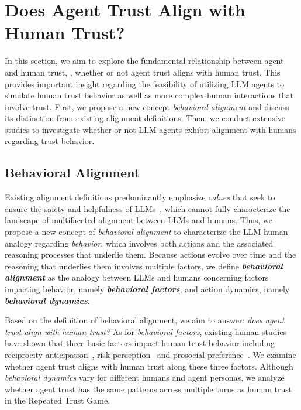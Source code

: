 

\vspace{-0.25cm}
\section{Does Agent Trust Align with Human Trust?}
\label{sec:alignment}
\vspace{-1.5mm}








In this section, we aim to explore the fundamental relationship between agent and human trust, \ie, whether or not agent trust aligns with human trust. This provides important insight regarding the feasibility of utilizing LLM agents to simulate human trust behavior as well as more complex human interactions that involve trust. First, we propose a new concept \textit{behavioral alignment} and discuss its distinction from existing alignment definitions. Then, we conduct extensive studies to investigate whether or not LLM agents exhibit alignment with humans regarding trust behavior. 

\vspace{-2mm}
\subsection{Behavioral Alignment}
\vspace{-1mm}
Existing alignment definitions predominantly emphasize \textit{values} that seek to ensure the safety and helpfulness of LLMs~\citep{ji2023ai,shen2023large,wang2023aligning}, which cannot fully characterize the landscape of multifaceted alignment between LLMs and humans.
Thus, we propose a new concept of \textit{behavioral alignment} to 
characterize the LLM-human  analogy regarding \textit{behavior}, which involves both actions and the associated reasoning processes that underlie them.
Because actions evolve over time and the reasoning that underlies them involves multiple factors, we define  \textbf{\textit{behavioral alignment}}
as the analogy between LLMs and humans concerning factors impacting behavior, namely \textbf{\textit{behavioral factors}}, and action dynamics, namely \textbf{\textit{behavioral dynamics}}.

Based on the definition of behavioral alignment, we aim to answer: \textit{does agent trust align with human trust?} As for \textit{behavioral factors}, existing human studies have shown that three basic factors impact human trust behavior including reciprocity anticipation~\citep{berg1995trust,coxHowIdentifyTrust2004b}, risk perception~\citep{BOHNET2004467} and prosocial preference~\citep{ferrerTrustGames2019a}. We examine whether agent trust aligns with human trust along these three factors. Although  \textit{behavioral dynamics} vary for different humans and agent personas, we analyze whether agent trust has the same patterns across multiple turns as human trust in the Repeated Trust Game. 

